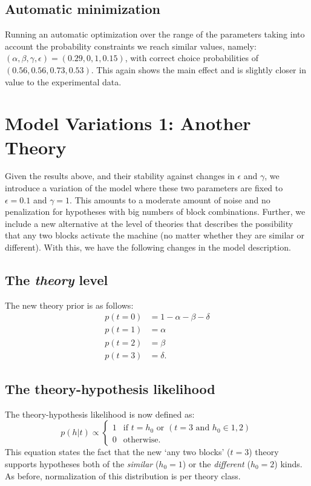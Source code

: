 \documentclass[11pt, a4paper]{article}
\begin{document}
 
 
\subsection*{Automatic minimization}
Running an automatic optimization over the range of the parameters taking into account the probability constraints we reach similar values, namely: $(\alpha,\beta,\gamma,\epsilon)=(0.29,0,1,0.15)$, with correct choice probabilities of $(0.56, 0.56, 0.73, 0.53)$. This again shows the main effect and is slightly closer in value to the experimental data. 
 
 
\section*{Model Variations 1: Another Theory}
Given the results above, and their stability against changes in $\epsilon$ and $\gamma$, we introduce a variation of the model where these two parameters are fixed to $\epsilon=0.1$ and $\gamma=1$. This amounts to a moderate amount of noise and no penalization for hypotheses with big numbers of block combinations. Further, we include a new alternative at the level of theories that describes the possibility that any two blocks activate the machine (no matter whether they are similar or different). With this, we have the following changes in the model description.

\subsection*{The \emph{theory} level}
The new theory prior is as follows:
\begin{equation}
\begin{split}
p(t=0)&=1-\alpha-\beta-\delta\\
p(t=1)&=\alpha\\
p(t=2)&=\beta\\
p(t=3)&=\delta.
\end{split} 
\end{equation}
 
\subsection*{The theory-hypothesis likelihood}
The theory-hypothesis likelihood is now defined as:
\begin{equation}
p(h|t) \propto
\begin{cases}
1 & \mbox{if } t=h_0 \textrm{ or } (t=3 \textrm{ and } h_0\in{1,2}) \\ 
0 & \mbox{otherwise}.
\end{cases}
\end{equation}
This equation states the fact that the new `any two blocks' ($t=3$) theory supports hypotheses both of the \emph{similar} ($h_0=1$) or the \emph{different} ($h_0=2$) kinds. As before, normalization of this distribution is per theory class.
 
\end{document}
